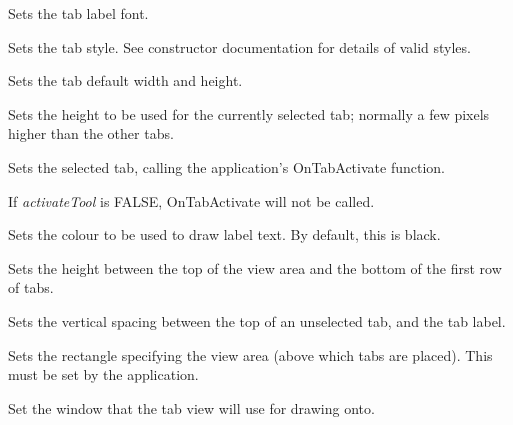 

Sets the tab label font.



Sets the tab style. See constructor documentation for details of valid styles.



Sets the tab default width and height.



Sets the height to be used for the currently selected tab; normally a few pixels
higher than the other tabs.



Sets the selected tab, calling the application's OnTabActivate function.

If {\it activateTool} is FALSE, OnTabActivate will not be called.



Sets the colour to be used to draw label text. By default, this is
black.



Sets the height between the top of the view area and the bottom of the first
row of tabs.



Sets the vertical spacing between the top of an unselected tab, and the tab label.

\label{wxtabviewsetviewrect}


Sets the rectangle specifying the view area (above which tabs are
placed). This must be set by the application. 



Set the window that the tab view will use for drawing onto.

